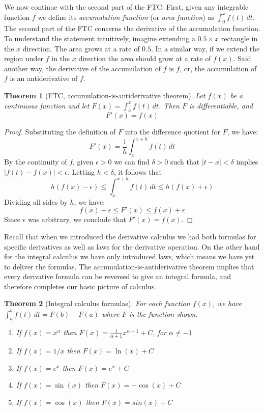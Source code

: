 \documentclass[11pt,oneside]{amsbook}
\theoremstyle{definition}
\theoremstyle{plain}
\newtheorem{theorem}{Theorem}[section]
\theoremstyle{definition}
\theoremstyle{remark}
\numberwithin{equation}{section}
\numberwithin{figure}{section}
\begin{document}
We now continue with the second part of the FTC. First, given any integrable function $f$ we define its \emph{accumulation function} (or \emph{area function}) as $\int_0^xf(t)\,dt$. The second part of the FTC concerns the derivative of the accumulation function. To understand the statement intuitively, imagine extending a $0.5\times x$ rectangle in the $x$ direction. The area grows at a rate of $0.5$. In a similar way, if we extend the region under $f$ in the $x$ direction the area should grow at a rate of $f(x)$. Said another way, the derivative of the accumulation of $f$ is $f$, or, the accumulation of $f$ is an antiderivative of $f$.

\begin{theorem}[FTC, accumulation-is-antiderivative theorem]
  Let $f(x)$ be a continuous function and let $F(x)=\int_a^x f(t)\,dt$. Then $F$ is differentiable, and
  \[F'(x)=f(x)
  \]
\end{theorem}

\begin{proof}
  Substituting the definition of $F$ into the difference quotient for $F$, we have:
  \[F'(x)=\frac{1}{h}\int_x^{x+h} f(t)\,dt
  \]
  By the continuity of $f$, given $\epsilon>0$ we can find $\delta>0$ such that $|t-x|<\delta$ implies $|f(t)-f(x)|<\epsilon$. Letting $h<\delta$, it follows that
  \[h(f(x)-\epsilon)\leq\int_x^{x+h} f(t)\,dt\leq h(f(x)+\epsilon)
  \]
  Dividing all sides by $h$, we have:
  \[f(x)-\epsilon\leq F'(x)\leq f(x)+\epsilon
  \]
  Since $\epsilon$ was arbitrary, we conclude that $F'(x)=f(x)$.
\end{proof}

Recall that when we introduced the derivative calculus we had both formulas for specific derivatives as well as laws for the derivative operation. On the other hand for the integral calculus we have only introduced laws, which means we have yet to deliver the formulas. The accumulation-is-antiderivative theorem implies that every derivative formula can be reversed to give an integral formula, and therefore completes our basic picture of calculus.

\begin{theorem}[Integral calculus formulas]
  For each function $f(x)$, we have $\int_a^bf(t)\,dt=F(b)-F(a)$ where $F$ is the function shown.
  \begin{enumerate}
    \item If $f(x)=x^\alpha$ then $F(x)=\frac{1}{\alpha+1}x^{\alpha+1}+C$, for $\alpha\neq-1$
    \item If $f(x)=1/x$ then $F(x)=\ln(x)+C$
    \item If $f(x)=e^x$ then $F(x)=e^x+C$
    \item If $f(x)=\sin(x)$ then $F(x)=-\cos(x)+C$
    \item If $f(x)=\cos(x)$ then $F(x)=sin(x)+C$
  \end{enumerate}
\end{theorem}
\end{document}
